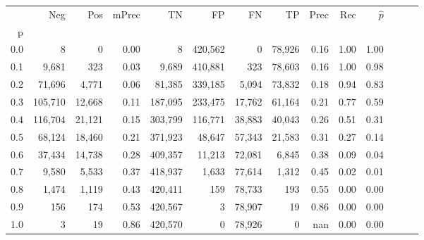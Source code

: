 \begin{tabular}{rrrrrrrrrrrrrr}
\toprule
{} &      Neg &     Pos & mPrec &       TN &       FP &      FN &      TP &  Prec &   Rec & $\hat{p}$ \\
p   &          &         &       &          &          &         &         &       &       &           \\
\midrule
0.0 &        8 &       0 &  0.00 &        8 &  420,562 &       0 &  78,926 &  0.16 &  1.00 &      1.00 \\
0.1 &    9,681 &     323 &  0.03 &    9,689 &  410,881 &     323 &  78,603 &  0.16 &  1.00 &      0.98 \\
0.2 &   71,696 &   4,771 &  0.06 &   81,385 &  339,185 &   5,094 &  73,832 &  0.18 &  0.94 &      0.83 \\
0.3 &  105,710 &  12,668 &  0.11 &  187,095 &  233,475 &  17,762 &  61,164 &  0.21 &  0.77 &      0.59 \\
0.4 &  116,704 &  21,121 &  0.15 &  303,799 &  116,771 &  38,883 &  40,043 &  0.26 &  0.51 &      0.31 \\
0.5 &   68,124 &  18,460 &  0.21 &  371,923 &   48,647 &  57,343 &  21,583 &  0.31 &  0.27 &      0.14 \\
0.6 &   37,434 &  14,738 &  0.28 &  409,357 &   11,213 &  72,081 &   6,845 &  0.38 &  0.09 &      0.04 \\
0.7 &    9,580 &   5,533 &  0.37 &  418,937 &    1,633 &  77,614 &   1,312 &  0.45 &  0.02 &      0.01 \\
0.8 &    1,474 &   1,119 &  0.43 &  420,411 &      159 &  78,733 &     193 &  0.55 &  0.00 &      0.00 \\
0.9 &      156 &     174 &  0.53 &  420,567 &        3 &  78,907 &      19 &  0.86 &  0.00 &      0.00 \\
1.0 &        3 &      19 &  0.86 &  420,570 &        0 &  78,926 &       0 &   nan &  0.00 &      0.00 \\
\bottomrule
\end{tabular}
